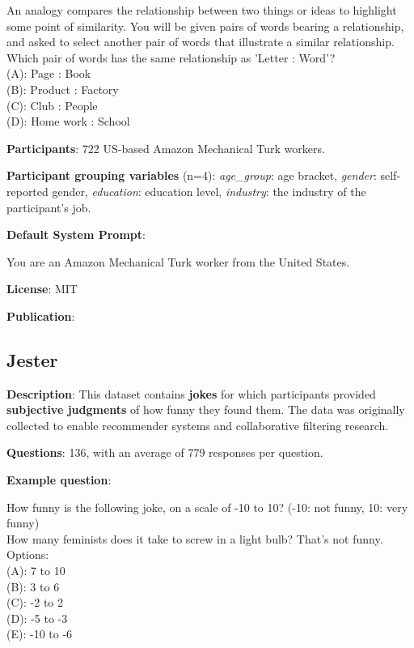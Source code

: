 \documentclass{article} %
\begin{document}
\begin{examplebox}
    An analogy compares the relationship between two things or ideas to highlight some point of similarity.
    You will be given pairs of words bearing a relationship, and asked to select another pair of words that illustrate a similar relationship.\\
    
    Which pair of words has the same relationship as 'Letter : Word'?\\
    
    (A): Page : Book\\
    (B): Product : Factory\\
    (C): Club : People\\
    (D): Home work : School
\end{examplebox}

\textbf{Participants}: 722 US-based Amazon Mechanical Turk workers.

\textbf{Participant grouping variables} (n=4):
\textit{age\_group}: age bracket,
\textit{gender}: self-reported gender,
\textit{education}: education level,
\textit{industry}: the industry of the participant's job.

\textbf{Default System Prompt}:
\begin{examplebox}
You are an Amazon Mechanical Turk worker from the United States.
\end{examplebox}
\textbf{License}: MIT

\textbf{Publication}: \cite{simoiu2019wisdomofcrowds}


\subsection{Jester}

\textbf{Description}: This dataset contains \textbf{jokes} for which participants provided \textbf{subjective judgments} of how funny they found them.
The data was originally collected to enable recommender systems and collaborative filtering research.

\textbf{Questions}: 136, with an average of 779 responses per question.

\textbf{Example question}:

\begin{examplebox}
    How funny is the following joke, on a scale of -10 to 10? (-10: not funny, 10: very funny)\\
    
    How many feminists does it take to screw in a light bulb? That's not funny.\\
    
    Options:\\
    (A): 7 to 10\\
    (B): 3 to 6\\
    (C): -2 to 2\\
    (D): -5 to -3\\
    (E): -10 to -6
\end{examplebox}
\end{document}
